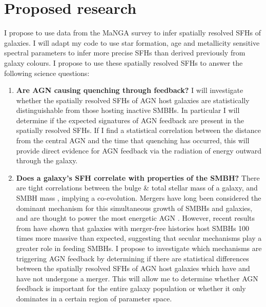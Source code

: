 \documentclass[11pt]{article}
\begin{document}
\vspace{-0.5em}
\section*{\large Proposed research}
\vspace{-0.5em}

I propose to use data from the MaNGA survey to infer spatially resolved SFHs of galaxies. I will adapt my code to use star formation, age and metallicity sensitive spectral parameters %
to infer more precise SFHs than derived previously from galaxy colours. I propose to use these spatially resolved SFHs to answer the following science questions:

\begin{enumerate}[leftmargin=*]

\item {\bf Are AGN causing quenching through feedback?} I will investigate whether the spatially resolved SFHs of AGN host galaxies are statistically distinguishable from those hosting inactive SMBHs. In particular I will determine if the expected signatures of AGN feedback are present in the spatially resolved SFHs. If I find a statistical correlation between the distance from the central AGN and the time that quenching has occurred, this will provide direct evidence for AGN feedback via the radiation of energy outward through the galaxy.

\item {\bf Does a galaxy's SFH correlate with properties of the SMBH?} There are tight correlations between the bulge \& total stellar mass of a galaxy, and SMBH mass \citep{haring04}, implying a co-evolution. Mergers have long been considered the dominant mechanism for this simultaneous growth of SMBHs and galaxies, and are thought to power the most energetic AGN \citep{hopkins08, treister12}. However, recent results from \citet[]{simmons17} have shown that galaxies with merger-free histories host SMBHs 100 times more massive than expected, suggesting that secular mechanisms play a greater role in feeding SMBHs. I propose to investigate which mechanisms are triggering AGN feedback by determining if there are statistical differences between the spatially resolved SFHs of AGN host galaxies which have and have not undergone a merger. This will allow me to determine whether AGN feedback is important for the entire galaxy population or whether it only dominates in a certain region of parameter space. 

\end{enumerate}
\end{document}
